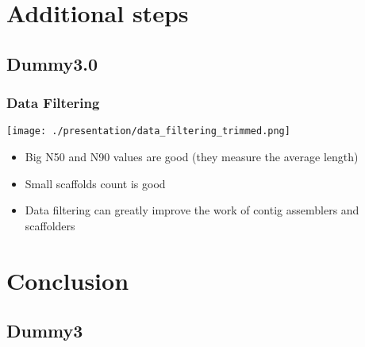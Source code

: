 \documentclass[compress]{beamer}
\begin{document}
\section{Additional steps} %
\label{sec:Additional steps}

\subsection*{Dummy3.0} %
\label{sub:Dummy3.0}

  \begin{frame}
    \frametitle{Data Filtering}
    \begin{multicols}{2}
      \vfill
      \begin{minipage}[c][0.8\textheight][c]{\columnwidth}
        {\texttt{[image: ./presentation/data\_filtering\_trimmed.png]}}
      \end{minipage}
      \vfill
      \columnbreak
      \begin{minipage}[c][0.8\textheight][c]{\columnwidth}
        \begin{itemize}
          \item Big N50 and N90 values are good (they measure the average
            length)
          \item Small scaffolds count is good
          \item Data filtering can greatly improve the work of contig assemblers
            and scaffolders
        \end{itemize}
      \end{minipage}
    \end{multicols}
  \end{frame}



\section{Conclusion} %
\label{sec:Conclusion}

\subsection*{Dummy3} %
\label{sub:Dummy3}
\end{document}
